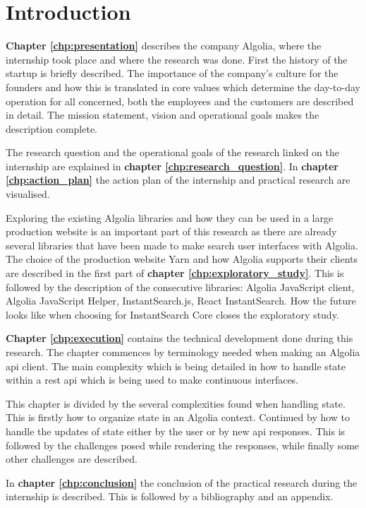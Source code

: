 
\chapter{Introduction} %
\label{chp:introduction}

\textbf{Chapter \ref{chp:presentation}} describes the company Algolia, where the internship took place and where the research was done. First the history of the startup is briefly described. The importance of the company’s culture for the founders and how this is translated in core values which determine the day-to-day operation for all concerned, both the employees and the customers are described in detail. The mission statement, vision and operational goals makes the description complete. 

The research question and the operational goals of the research linked on the internship are explained in \textbf{chapter \ref{chp:research_question}}. 
In \textbf{chapter \ref{chp:action_plan}} the action plan of the internship and practical research are visualised.

Exploring the existing Algolia libraries and how they can be used in a large production website is an important part of this research as there are already several libraries that have been made to make search user interfaces with Algolia. The choice of the production website Yarn\cite{yarn-site} and how Algolia supports their clients are described in the first part of \textbf{chapter \ref{chp:exploratory_study}}. This is followed  by the description of the consecutive libraries: Algolia JavaScript client, Algolia JavaScript Helper, InstantSearch.js, React InstantSearch. How the future looks like when choosing for InstantSearch Core closes the exploratory study.

\textbf{Chapter \ref{chp:execution}} contains the technical development done during this research. The chapter commences by terminology needed when making an Algolia \acrshort{api} client. The main complexity which is being detailed in how to handle state within a \acrshort{rest} \acrshort{api} which is being used to make continuous interfaces. 

This chapter is divided by the several complexities found when handling state. This is firstly how to organize state in an Algolia context. Continued by how to handle the updates of state either by the user or by new \acrshort{api} responses. This is followed by the challenges posed while rendering the responses, while finally some other challenges are described.

In \textbf{chapter \ref{chp:conclusion}} the conclusion of the practical research during the internship is described. This is followed by a bibliography and an appendix.
